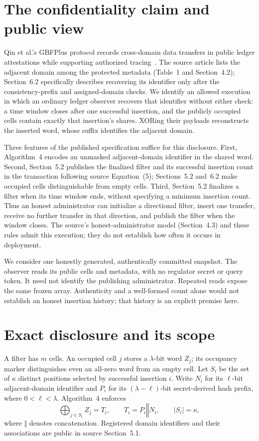 \section{The confidentiality claim and public view}

Qin et al.'s GBFPlus protocol records cross-domain data transfers in public
ledger attestations while supporting authorized tracing~\cite{qin2026gbfplus}.
The source article lists the adjacent domain among the protected metadata
(Table~1 and Section~4.2); Section~6.2 specifically describes recovering its
identifier only after the consistency-prefix and assigned-domain checks.
We identify an allowed execution in which an ordinary ledger observer recovers
that identifier without either check: a time window closes after one successful
insertion, and the publicly occupied cells contain exactly that insertion's
shares. XORing their payloads reconstructs the inserted word, whose suffix
identifies the adjacent domain.

Three features of the published specification suffice for this disclosure.
First, Algorithm~4 encodes an unmasked adjacent-domain identifier in the shared
word. Second, Section~5.2 publishes the finalized filter and its successful
insertion count in the transaction following source Equation~(5); Sections~5.2
and~6.2 make occupied cells distinguishable from empty cells. Third,
Section~5.2 finalizes a filter when its time window ends, without specifying
a minimum insertion count. Thus an honest administrator can initialize a
directional filter, insert one transfer, receive no further transfer in that
direction, and publish the filter when the window closes. The source's
honest-administrator model (Section~4.3) and these rules admit this execution;
they do not establish how often it occurs in deployment.

We consider one honestly generated, authentically committed snapshot.
The observer reads its public cells and metadata, with no regulator secret
or query token. It need not identify the publishing administrator. Repeated
reads expose the same frozen array. Authenticity and a well-formed count
alone would not establish an honest insertion history; that history is an
explicit premise here.

\section{Exact disclosure and its scope}

A filter has $m$ cells. An occupied cell $j$ stores a $\lambda$-bit word $Z_j$;
its occupancy marker distinguishes even an all-zero word from an empty cell.
Let $S_i$ be the set of $\kappa$ distinct positions selected by successful
insertion $i$. Write $N_i$ for its $\ell$-bit adjacent-domain identifier and
$P_i$ for its $(\lambda-\ell)$-bit secret-derived hash prefix, where
$0<\ell<\lambda$. Algorithm~4 enforces
\begin{equation}
  \bigoplus_{j\in S_i} Z_j = T_i,
  \qquad T_i=P_i\mathbin\Vert N_i,
  \qquad |S_i|=\kappa,
  \label{eq:row}
\end{equation}
where $\Vert$ denotes concatenation. Registered domain identifiers and their
associations are public in source Section~5.1.

